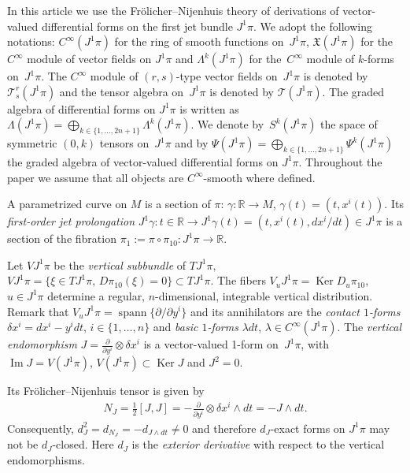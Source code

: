 \documentclass[pdftex]{sigma}
\begin{document}
In this article we use the Fr\"olicher--Nijenhuis theory \cite{frolicher56,grifone00,KMS93}
of derivations of vector-valued dif\/ferential forms on the f\/irst jet
bundle $J^{1}\pi$. We adopt the following notations: $C^{\infty}(J^{1}\pi)$
for the ring of smooth functions on~$J^{1}\pi$, $\mathfrak{X}(J^{1}\pi)$
for the~$C^{\infty}$ module of vector f\/ields on $J^{1}\pi$ and $\Lambda^{k}(J^{1}\pi)$
for the~$C^{\infty}$ module of $k$-forms on~$J^{1}\pi$. The $C^{\infty}$
module of $(r,s)$-type vector f\/ields on~$J^{1}\pi$ is denoted by
$\mathcal{T}_{s}^{r}(J^{1}\pi)$ and the tensor algebra on~$J^{1}\pi$
is denoted by $\mathcal{T}(J^{1}\pi)$. The graded algebra of dif\/ferential
forms on $J^{1}\pi$ is written as $\Lambda(J^{1}\pi)=\bigoplus_{k\in \{1,\dots,2n+1\}}\Lambda^{k}(J^{1}\pi)$.
We denote by~$S^{k}(J^{1}\pi)$ the space of symmetric $(0,k)$ tensors
on~$J^{1}\pi$ and by $\Psi(J^{1}\pi)=\bigoplus_{k\in \{1,\dots,2n+1\}}\Psi^{k}(J^{1}\pi)$
the graded algebra of vector-valued dif\/ferential forms on $J^{1}\pi$.
Throughout the paper we assume that all objects are $C^{\infty}$-smooth
where def\/ined.

A parametrized curve on $M$ is a section of $\pi$: $\gamma:\mathbb{R}\rightarrow M$,
$\gamma(t)=(t,x^{i}(t))$. Its \emph{first-order jet prolongation}
$J^{1}\gamma:t\in\mathbb{R}\rightarrow J^{1}\gamma(t)=\left(t,x^{i}(t),dx^{i}/dt\right)\in J^{1}\pi$
is a section of the f\/ibration $\pi_{1}:=\pi\circ\pi_{10}:  J^{1}\pi\rightarrow\mathbb{R}$.

Let $VJ^{1}\pi$ be the \emph{vertical subbundle} of $TJ^{1}\pi,$
$VJ^{1}\pi=\{\xi\in TJ^{1}\pi,\,  D\pi_{10}(\xi)=0\}\subset TJ^{1}\pi$.
The f\/ibers $V_{u}J^{1}\pi=\operatorname{Ker} D_{u}\pi_{10}$, $u\in J^{1}\pi$ determine
a regular, $n$-dimensional, integrable vertical distribution. Remark
that $V_{u}J^{1}\pi=\operatorname{spann}\{\partial/\partial y^{i}\}$
and its annihilators are the \emph{contact $1$-forms} $\delta x^{i}=dx^{i}-y^{i}dt$, $i\in \{1,\dots,n\}$
and \emph{basic $1$-forms} $\lambda dt$, $\lambda\in C^{\infty}(J^{1}\pi)$.
The \emph{vertical endomorphism} $J=\frac{\partial}{\partial y^{i}}\otimes\delta x^{i}$
is a vector-valued 1-form on~$J^{1}\pi$, with $\operatorname{Im}J=V(J^{1}\pi)$,
$V(J^{1}\pi)\subset\operatorname{Ker}J$ and $J^{2}=0$.

Its Fr\"olicher--Nijenhuis tensor is given by
\begin{gather*}
N_{J}=\frac{1}{2}[J,J]=-\frac{\partial}{\partial y^{i}}\otimes\delta x^{i}\wedge dt=-J\wedge dt.
\end{gather*}
 Consequently, $d_{J}^{2}=d_{N_{J}}=-d_{J\wedge dt}\neq0$ and therefore
$d_{J}$-exact forms on $J^{1}\pi$ may not be $d_{J}$-closed. Here
$d_{J}$ is the \emph{exterior derivative} with respect to the vertical
endomorphisms.
\end{document}
